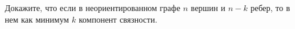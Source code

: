 Докажите, что если в неориентированном графе $n$ вершин и $n - k$ ребер, то в нем как минимум $k$ компонент связности.